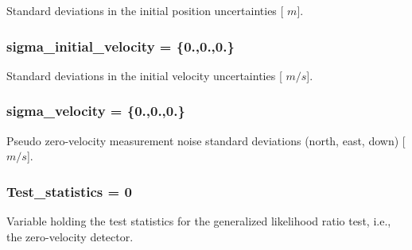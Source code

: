 \-Standard deviations in the initial position uncertainties \mbox{[} $m$\mbox{]}. 

\hypertarget{group__nav__eq_ga5abe69320e5702cb7f4b79abb9bcf297}{
\subsubsection[{sigma\-\_\-initial\-\_\-velocity}]{ {\bf sigma\-\_\-initial\-\_\-velocity} = \{0.,0.,0.\}}}
\label{group__nav__eq_ga5abe69320e5702cb7f4b79abb9bcf297}


\-Standard deviations in the initial velocity uncertainties \mbox{[} $m/s$\mbox{]}. 

\hypertarget{group__nav__eq_gae79b582d3d0132b84117242e1f6103f3}{
\subsubsection[{sigma\-\_\-velocity}]{ {\bf sigma\-\_\-velocity} = \{0.,0.,0.\}}}
\label{group__nav__eq_gae79b582d3d0132b84117242e1f6103f3}


\-Pseudo zero-\/velocity measurement noise standard deviations (north, east, down) \mbox{[} $m/s$\mbox{]}. 

\hypertarget{group__nav__eq_gae420c23e5d1fdf5b157535212ddeba9e}{
\subsubsection[{\-Test\-\_\-statistics}]{ {\bf \-Test\-\_\-statistics} = 0}}
\label{group__nav__eq_gae420c23e5d1fdf5b157535212ddeba9e}


\-Variable holding the test statistics for the generalized likelihood ratio test, i.\-e., the zero-\/velocity detector. 

